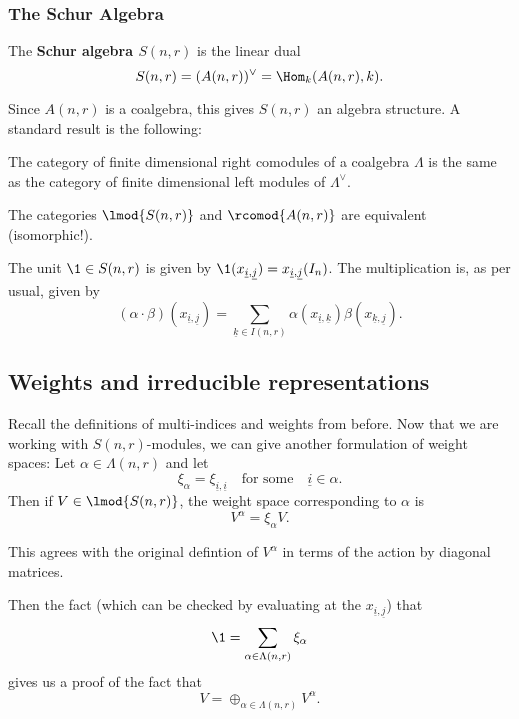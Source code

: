 \documentclass[12pt]{article}
\begin{document}
		\subsubsection{The Schur Algebra}
		\begin{defn}
			The \textbf{Schur algebra $S(n,r)$} is the linear dual 
			\[S(n,r)=(A(n,r))^\vee=\Hom_k(A(n,r),k).\]
		\end{defn}
		Since $A(n,r)$ is a coalgebra, this gives $S(n,r)$ an algebra structure. A standard result is the following:
		\begin{lem}
			The category of finite dimensional right comodules of a coalgebra $\Lambda$ is the same as the category 
			of finite dimensional left modules of $\Lambda^\vee$.
		\end{lem}
		\begin{cor}
			The categories $\lmod{S(n,r)}$ and $\rcomod{A(n,r)}$ are equivalent (isomorphic!).
		\end{cor}
		\begin{rmk}
			The unit $\1\in S(n,r)$ is given by $\1(x_{\underline i,\underline j})=x_{\underline i,\underline j}(I_n)$. The multiplication is, as 
			per usual, given by 
			\[(\alpha\cdot\beta)(x_{\underline i,\underline j})=\sum_{\underline k\in I(n,r)}\alpha(x_{\underline i,\underline k})\beta(x_{\underline k,\underline j}).\]
		\end{rmk}
	\subsection{Weights and irreducible representations}
	Recall the definitions of multi-indices and weights from before. Now that we are working with $S(n,r)$-modules, 
	we can give another formulation of weight spaces: Let $\alpha\in\Lambda(n,r)$ and let 
	\[\xi_\alpha=\xi_{\underline i,\underline i}\quad\text{for some}\quad \underline i\in\alpha.\]
	Then if $V\in \lmod{S(n,r)}$, the weight space corresponding to $\alpha$ is 
	\[V^\alpha=\xi_{\alpha}V.\]
	\begin{prop}
		This agrees with the original defintion of $V^\alpha$ in terms of the action by diagonal matrices.
	\end{prop}
	Then the fact (which can be checked by evaluating at the $x_{\underline i,\underline j}$) that 
	\[\1=\sum_{\alpha\in\Lambda(n,r)}\xi_\alpha\]
	gives us a proof of the fact that 
	\[V=\oplus_{\alpha\in \Lambda(n,r)}V^\alpha.\]
\end{document}
